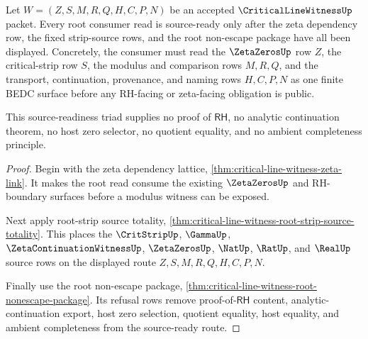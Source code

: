 \begin{theorem}
\label{thm:critical-line-witness-root-source-readiness-triad}
Let $W=(Z,S,M,R,Q,H,C,P,N)$ be an accepted $\CriticalLineWitnessUp$ packet.
Every root consumer read is source-ready only after the zeta dependency row,
the fixed strip-source rows, and the root non-escape package have all been
displayed. Concretely, the consumer must read the $\ZetaZerosUp$ row $Z$, the
critical-strip row $S$, the modulus and comparison rows $M,R,Q$, and the
transport, continuation, provenance, and naming rows $H,C,P,N$ as one finite
BEDC surface before any RH-facing or zeta-facing obligation is public.

This source-readiness triad supplies no proof of $\mathsf{RH}$, no analytic
continuation theorem, no host zero selector, no quotient equality, and no
ambient completeness principle.
\end{theorem}
\begin{proof}
Begin with the zeta dependency lattice,
\autoref{thm:critical-line-witness-zeta-link}. It makes the root read consume
the existing $\ZetaZerosUp$ and RH-boundary surfaces before a modulus witness
can be exposed.

Next apply root-strip source totality,
\autoref{thm:critical-line-witness-root-strip-source-totality}. This places
the $\CritStripUp$, $\GammaUp$, $\ZetaContinuationWitnessUp$,
$\ZetaZerosUp$, $\NatUp$, $\RatUp$, and $\RealUp$ source rows on the displayed
route $Z,S,M,R,Q,H,C,P,N$.

Finally use the root non-escape package,
\autoref{thm:critical-line-witness-root-nonescape-package}. Its refusal rows
remove proof-of-$\mathsf{RH}$ content, analytic-continuation export, host zero
selection, quotient equality, host equality, and ambient completeness from
the source-ready route.
\end{proof}

